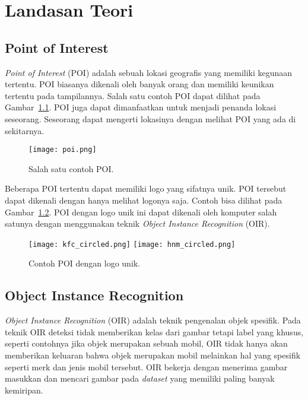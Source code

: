 \chapter{Landasan Teori}
\label{chap:landasan_teori}

\section{Point of Interest}
\label{sec:poi}

\textit{Point of Interest} (POI) adalah sebuah lokasi geografis yang memiliki kegunaan tertentu. POI biasanya dikenali oleh banyak orang dan memiliki keunikan tertentu pada tampilannya. Salah satu contoh POI dapat dilihat pada Gambar~\ref{fig:poi}. POI juga dapat dimanfaatkan untuk menjadi penanda lokasi seseorang. Seseorang dapat mengerti lokasinya dengan melihat POI yang ada di sekitarnya.
\begin{figure}[H]
	\centering
	\texttt{[image: poi.png]}
	\caption{Salah satu contoh POI.}
	\label{fig:poi}
\end{figure}

Beberapa POI tertentu dapat memiliki logo yang sifatnya unik. POI tersebut dapat dikenali dengan hanya melihat logonya saja. Contoh bisa dilihat pada Gambar~\ref{fig:poi_logo}. POI dengan logo unik ini dapat dikenali oleh komputer salah satunya dengan menggunakan teknik \textit{Object Instance Recognition} (OIR). 
\begin{figure}[H]
	\centering
	\texttt{[image: kfc\_circled.png]}
	\texttt{[image: hnm\_circled.png]}
	\caption{Contoh POI dengan logo unik.}
	\label{fig:poi_logo}
\end{figure}

\section{Object Instance Recognition}
\label{sec:oir}

\textit{Object Instance Recognition} (OIR) adalah teknik pengenalan objek spesifik. Pada teknik OIR deteksi tidak memberikan kelas dari gambar tetapi label yang khusus, seperti contohnya jika objek merupakan sebuah mobil, OIR tidak hanya akan memberikan keluaran bahwa objek merupakan mobil melainkan hal yang spesifik seperti merk dan jenis mobil tersebut. OIR bekerja dengan menerima gambar masukkan dan mencari gambar pada \textit{dataset} yang memiliki paling banyak kemiripan.

